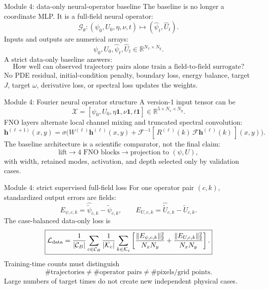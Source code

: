 \documentclass[aspectratio=169,11pt]{beamer}
\newcommand{\vect}[1]{\bm{#1}}
\newcommand{\currentmodule}{Module 1}
\newcommand{\moduleprogress}{1 of 4}
\newcommand{\setmodule}[2]{%
  \renewcommand{\currentmodule}{#1}%
  \renewcommand{\moduleprogress}{#2}%
}
\begin{document}

\setmodule{Module 4}{1 of 4}
\begin{frame}[t]{Module 4: data-only neural-operator baseline}
\vspace{-0.15em}
The baseline is no longer a coordinate MLP. It is a full-field neural operator:
\[
\boxed{\mathcal G_\theta:(\psi_0,U_0,\eta,\nu,t)\mapsto(\widehat\psi_t,\widehat U_t).}
\]
Inputs and outputs are numerical arrays:
\[
\psi_0,U_0,\widehat\psi_t,\widehat U_t\in\mathbb R^{N_x\times N_y}.
\]
A strict data-only baseline answers:
\[
\text{How well can observed trajectory pairs alone train a field-to-field surrogate?}
\]
No PDE residual, initial-condition penalty, boundary loss, energy balance, target $J$, target $\omega$, derivative loss, or spectral loss updates the weights.
\end{frame}

\setmodule{Module 4}{2 of 4}
\begin{frame}[t]{Module 4: Fourier neural operator structure}
\vspace{-0.15em}
A version-1 input tensor can be
\[
\mathcal X=[\psi_0,U_0,\eta\mathbf 1,\nu\mathbf 1,t\mathbf 1]
\in\mathbb R^{5\times N_x\times N_y}.
\]
FNO layers alternate local channel mixing and truncated spectral convolution:
\[
\vect h^{(\ell+1)}(x,y)
=\sigma\!\bigl(W^{(\ell)}\vect h^{(\ell)}(x,y)
+\mathcal F^{-1}[\,R^{(\ell)}(k)\,\mathcal F\vect h^{(\ell)}(k)\,](x,y)\bigr).
\]
The baseline architecture is a scientific comparator, not the final claim:
\[
\text{lift}\rightarrow 4\text{ FNO blocks}\rightarrow \text{projection to }(\psi,U),
\]
with width, retained modes, activation, and depth selected only by validation cases.
\end{frame}

\setmodule{Module 4}{3 of 4}
\begin{frame}[t]{Module 4: strict supervised full-field loss}
\vspace{-0.15em}
For one operator pair $(c,k)$, standardized output errors are fields:
\[
E_{\psi,c,k}=\widehat{\widetilde\psi}_{c,k}-\widetilde\psi_{c,k},
\qquad
E_{U,c,k}=\widehat{\widetilde U}_{c,k}-\widetilde U_{c,k}.
\]
The case-balanced data-only loss is
\[
\boxed{
\mathcal L_{\rm data}=\frac1{|\mathcal C_B|}\sum_{c\in\mathcal C_B}
\frac1{|\mathcal K_c|}\sum_{k\in\mathcal K_c}
\left[
\frac{\|E_{\psi,c,k}\|_2^2}{N_xN_y}
+\frac{\|E_{U,c,k}\|_2^2}{N_xN_y}
\right].}
\]
Training-time counts must distinguish
\[
\#\text{trajectories}\ne\#\text{operator pairs}\ne\#\text{pixels/grid points}.
\]
Large numbers of target times do not create new independent physical cases.
\end{frame}
\end{document}
